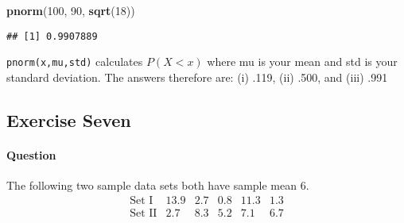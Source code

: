 \documentclass[]{article}
\newenvironment{Shaded}{\begin{snugshade}}{\end{snugshade}}
\newcommand{\KeywordTok}[1]{\textcolor[rgb]{0.13,0.29,0.53}{\textbf{#1}}}
\newcommand{\DecValTok}[1]{\textcolor[rgb]{0.00,0.00,0.81}{#1}}
\newcommand{\NormalTok}[1]{#1}
\let\oldparagraph\paragraph
\renewcommand{\paragraph}[1]{\oldparagraph{#1}\mbox{}}
\begin{document}
\begin{Shaded}
\begin{Highlighting}[]
\KeywordTok{pnorm}\NormalTok{(}\DecValTok{100}\NormalTok{, }\DecValTok{90}\NormalTok{, }\KeywordTok{sqrt}\NormalTok{(}\DecValTok{18}\NormalTok{))}
\end{Highlighting}
\end{Shaded}

\begin{verbatim}
## [1] 0.9907889
\end{verbatim}

\texttt{pnorm(x,mu,std)} calculates \(P(X < x)\) where mu is your mean
and std is your standard deviation. The answers therefore are: (i) .119,
(ii) .500, and (iii) .991

\pagebreak

\subsection{Exercise Seven}\label{exercise-seven}

\paragraph{Question}\label{question-6}

The following two sample data sets both have sample mean 6.
\[\begin{array}
{cccccccccc}
\text{Set I} & 13.9 & 2.7 & 0.8 & 11.3 & 1.3 \\
\text{Set II} & 2.7 & 8.3 & 5.2 & 7.1 & 6.7 \\
\end{array}
\]
\end{document}
